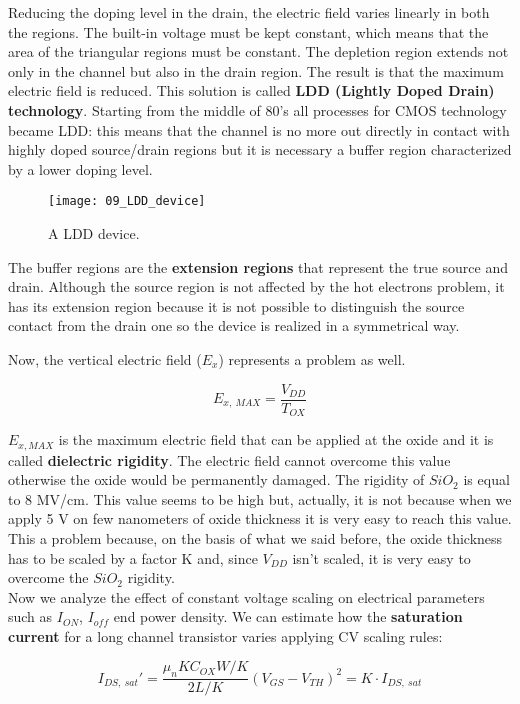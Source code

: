 \documentclass[a4paper, 12pt, twoside, openright]{report}
\begin{document}
\begin{enumerate}
Reducing the doping level in the drain, the electric field varies linearly in both the regions. The built-in voltage must be kept constant, which means that the area of the triangular regions must be constant. The depletion region extends not only in the channel but also in the drain region. The result is that the maximum electric field is reduced. This solution is called \textbf{LDD (Lightly Doped Drain) technology}.
Starting from the middle of 80's all processes for CMOS technology became LDD: this means that the channel is no more out directly in contact with highly doped source/drain regions but it is necessary a buffer region characterized by a lower doping level.

 	\begin{figure}[H]
	\centering
	\texttt{[image: 09\_LDD\_device]}
	\caption{A LDD device.}
	\label{}
	\end{figure}

The buffer regions are the \textbf{extension regions} that represent the true source and drain. Although the source region is not affected by the hot electrons problem, it has its extension region because it is not possible to distinguish the source contact from the drain one so the device is realized in a symmetrical way.

Now, the vertical electric field ($E_{x}$) represents a problem as well.

\begin{equation}
E_{x,\ MAX} = \frac{V_{DD}}{T_{OX}}
\end{equation}

$E_{x, MAX}$ is the maximum electric field that can be applied at the oxide and it is called \textbf{dielectric rigidity}. The electric field cannot overcome this value otherwise the oxide would be permanently damaged. The rigidity of $SiO_{2}$ is equal to 8 MV/cm. This value seems to be high but, actually, it is not because when we apply 5 V on few nanometers of oxide thickness it is very easy to reach this value. This a problem because, on the basis of what we said before, the oxide thickness has to be scaled by a factor K and, since $V_{DD}$ isn't scaled, it is very easy to overcome the $SiO_{2}$ rigidity. \\
Now we analyze the effect of constant voltage scaling on electrical parameters such as $I_{ON}$, $I_{off}$ end power density.
We can estimate how the \textbf{saturation current} for a long channel transistor varies applying CV scaling rules:

\begin{equation}
I_{DS,\ sat}' = \frac{\mu_n K C_{OX} W/K}{2 L/K}(V_{GS} - V_{TH})^2 = K \cdot I_{DS,\ sat}
\end{equation}


\end{enumerate}
\end{document}
